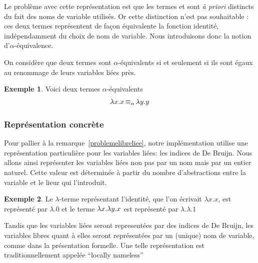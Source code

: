 \documentclass {article}
\theoremstyle{definition}
\newtheorem{example}{Exemple}
\theoremstyle{remark}
\begin{document}
\newcommand{\equivAlpha}{\mathop{\equiv_\alpha}}

Le problème avec cette représentation est que les termes
 et  sont \textit{à
  priori} distincts du fait des noms de variable utilisés. Or cette
distinction n'est pas souhaitable : ces deux termes représentent de
façon équivalente la fonction identité, indépendamment du choix de nom
de variable. Nous introduisons donc la notion d'$\alpha$-équivalence.

On considère que deux termes sont \(\alpha\)-équivalents si et seulement si ils sont 
égaux au renommage de leurs variables liées près. 
\begin{example}
  Voici deux termes \(\alpha\)-équivalents 
  \begin{align*}
    & \Lam{x}{\Var{x}} \equivAlpha \Lam{y}{\Var{y}} \\
  \end{align*}
\end{example}

\subsubsection{Représentation concrète}
 
Pour pallier à la remarque~\ref{problemelibreliee}, notre implémentation utilise une représentation
particulière pour les variables liées: les indices de De Bruijn.  Nous
allons ainsi représenter les variables liées non pas par un nom mais
par un entier naturel. Cette valeur est déterminée à partir du nombre
d'abstractions entre la variable et le lieur qui l'introduit.

\begin{example}
  Le $\lambda$-terme représentant l'identité, que l'on écrivait \(\lambda x.x\), est représenté par \(\lambda.0\)
  et le terme $\lambda x. \lambda y. x$ est représenté par $\lambda.\lambda.1$ 
\end{example}

Tandis que les variables liées seront representées par des
indices de De Bruijn, les variables libres quant à elles seront
représentées par un (unique) nom de variable, comme dans la
présentation formelle. Une telle représentation est traditionnellement
appelée ``locally nameless''~\citep{chargueraud:locally-nameless}
\end{document}
